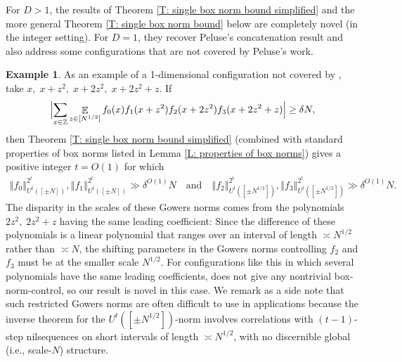 \documentclass[11pt]{amsart}
\theoremstyle{definition}
\newtheorem{example}[lemma]{Example} %
\DeclareMathOperator*{\E}{\mathbb{E}}
\newcommand{\Z}{{\mathbb Z}}
\newcommand{\norm}[1]{\left\Vert #1\right\Vert}
\newcommand{\Bigabs}[1]{\Bigl| #1 \Bigr|}
\begin{document}
For $D>1$, the results of Theorem \ref{T: single box norm bound simplified} and the more general Theorem \ref{T: single box norm bound} below are completely novel (in the integer setting).  For $D=1$, they recover Peluse's concatenation result \cite[Theorem 6.1]{Pel20} and also address some configurations that are not covered by Peluse's work.
\begin{example}\label{Ex: Peluse}
    As an example of a 1-dimensional configuration not covered by \cite[Theorem 6.1]{Pel20}, take $x,\; x + z^2,\; x+ 2z^2,\; x + 2z^2 + z$. If 
    \begin{align*}
        \Bigabs{\sum_{x\in\Z}\E_{z\in[N^{1/2}]}f_0(x)f_1(x + z^2) f_2(x + 2z^2)f_3(x + 2z^2 + z)} \geq \delta N,
    \end{align*}
    then Theorem \ref{T: single box norm bound simplified} (combined with standard properties of box norms listed in Lemma \ref{L: properties of box norms}) gives a positive integer $t=O(1)$ for which
    \begin{align*}
        \norm{f_0}_{U^t([\pm N])}^{2^t}, \norm{f_1}_{U^t([\pm N])}^{2^t}\gg \delta^{O(1)}N \quad \text{and}\quad \norm{f_2}_{U^t([\pm N^{1/2}])}^{2^t}, \norm{f_3}_{U^t([\pm N^{1/2}])}^{2^t}\gg \delta^{O(1)}N.
    \end{align*}
    The disparity in the scales of these Gowers norms comes from the polynomials $2z^2,\; 2z^2 + z$ having the same leading coefficient: Since the difference of these polynomials is a linear polynomial that ranges over an interval of length $\asymp N^{1/2}$ rather than $\asymp N$, the shifting parameters in the Gowers norms controlling $f_2$ and $f_3$ must be at the smaller scale $N^{1/2}$. For configurations like this in which several polynomials have the same leading coefficients, \cite[Theorem 6.1]{Pel20} does not give any nontrivial box-norm-control, so our result is novel in this case. We remark as a side note that such restricted Gowers norms are often difficult to use in applications because the inverse theorem for the $U^t([\pm N^{1/2}])$-norm involves correlations with $(t-1)$-step nilsequences on short intervals of length $\asymp N^{1/2}$, with no discernible global (i.e., scale-$N$) structure.
\end{example}
\end{document}
